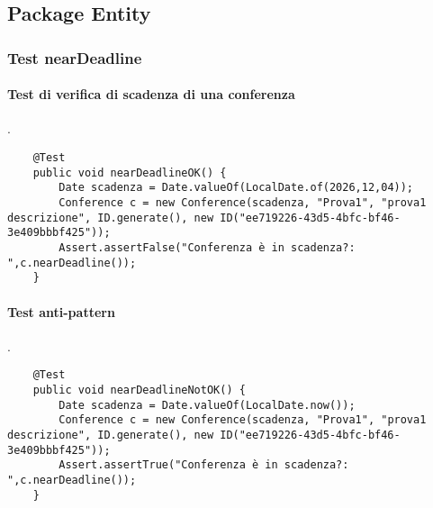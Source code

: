 \subsection{Package Entity}
\label{sec:test_unita_package_entity}

\subsubsection{Test nearDeadline}
\paragraph{Test di verifica di scadenza di una conferenza }
.
\begin{lstlisting}
    @Test
    public void nearDeadlineOK() {
        Date scadenza = Date.valueOf(LocalDate.of(2026,12,04));
        Conference c = new Conference(scadenza, "Prova1", "prova1 descrizione", ID.generate(), new ID("ee719226-43d5-4bfc-bf46-3e409bbbf425"));
        Assert.assertFalse("Conferenza è in scadenza?: ",c.nearDeadline());
    }
\end{lstlisting}
\paragraph{Test anti-pattern }
.
\begin{lstlisting}
    @Test
    public void nearDeadlineNotOK() {
        Date scadenza = Date.valueOf(LocalDate.now());
        Conference c = new Conference(scadenza, "Prova1", "prova1 descrizione", ID.generate(), new ID("ee719226-43d5-4bfc-bf46-3e409bbbf425"));
        Assert.assertTrue("Conferenza è in scadenza?: ",c.nearDeadline());
    }
\end{lstlisting}
